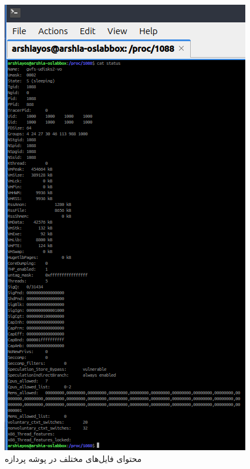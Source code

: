 \documentclass[12pt]{article}
\begin{document}
	\begin{figure}[H]
		\centering
		\includegraphics[width=\textwidth]{report3-resources/12.png}
		\caption{محتوای فایل‌های مختلف در پوشه پردازه}
		\label{fig:11}
	\end{figure}
\end{document}
